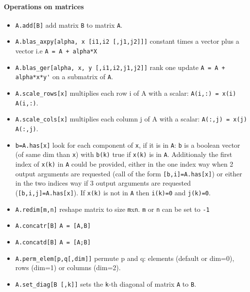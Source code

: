 \paragraph{Operations on matrices}
\begin{itemize}
\item \verb+A.add[B]+  add matrix \verb+B+ to matrix \verb+A+.
\item \verb+A.blas_axpy[alpha, x [i1,i2 [,j1,j2]]]+ constant times a vector plus a vector i.e \verb!A = A + alpha*X!
\item \verb+A.blas_ger[alpha, x, y [,i1,i2,j1,j2]]+  rank one update \verb!A = A + alpha*x*y'!
  on a submatrix of \verb+A+.
\item \verb+A.scale_rows[x]+ multiplies each row i of A with a scalar:
  \verb+A(i,:) = x(i) A(i,:)+. %
\item \verb+A.scale_cols[x]+ multiplies each column j of A with a scalar:
  \verb+A(:,j) = x(j) A(:,j)+. %
\item \verb+b=A.has[x]+ look for each component of \verb+x+, 
  if it is in \verb+A+: \verb+b+ is a boolean vector 
  (of same dim than \verb+x+) with \verb+b(k)+ true if
  \verb+x(k)+ is in \verb+A+. Additionaly the first index of
  \verb+x(k)+ in \verb+A+ could be provided, either in the one index way
  when 2 output arguments are requested (call of the form \verb+[b,i]=A.has[x]+) or
  either in the two indices way if 3 output arguments are requested
  (\verb+[b,i,j]=A.has[x]+). If \verb+x(k)+ is not in \verb+A+ then
  \verb+i(k)=0+ and \verb+j(k)=0+.
\end{itemize}
\begin{itemize}
\item \verb+A.redim[m,n]+ reshape matrix to size \verb+m+x\verb+n+. \verb+m+ or \verb+n+ can be set to \verb+-1+ 
\item \verb+A.concatr[B]+ \verb+A = [A,B]+
\item \verb+A.concatd[B]+ \verb+A = [A;B]+
\item \verb+A.perm_elem[p,q[,dim]]+ permute p and q: elements
  (default or dim=0), rows (dim=1) or columns (dim=2).
\item \verb+A.set_diag[B [,k]]+ sets the \verb+k+-th diagonal of matrix \verb+A+ to \verb+B+.
\end{itemize}

